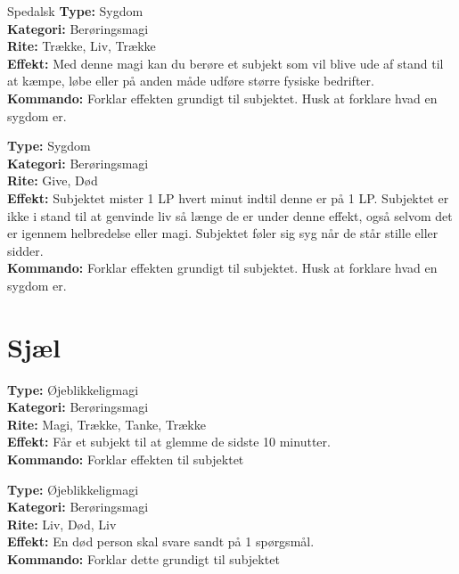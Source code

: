 \begin{sygdom*}Spedalsk
\textbf{Type:} Sygdom\\
\textbf{Kategori:} Berøringsmagi\\
\textbf{Rite:} Trække, Liv, Trække\\
\textbf{Effekt:} Med denne magi kan du berøre et subjekt som vil blive ude af stand til at kæmpe, løbe eller på anden måde udføre større fysiske bedrifter.\\
\textbf{Kommando:} Forklar effekten grundigt til subjektet. Husk at forklare hvad en sygdom er.
\end{sygdom*}

\begin{sygdom*}[Pest]
\textbf{Type:} Sygdom\\
\textbf{Kategori:} Berøringsmagi\\
\textbf{Rite:} Give, Død\\
\textbf{Effekt:} Subjektet mister 1 LP hvert minut indtil denne er på 1 LP. Subjektet er ikke i stand til at genvinde liv så længe de er under denne effekt, også selvom det er igennem helbredelse eller magi. Subjektet føler sig syg når de står stille eller sidder.\\
\textbf{Kommando:} Forklar effekten grundigt til subjektet. Husk at forklare hvad en sygdom er.
\end{sygdom*}

\section*{Sjæl}
\begin{nSjæl*}[Glemsel]
\textbf{Type:} Øjeblikkeligmagi\\
\textbf{Kategori:} Berøringsmagi\\
\textbf{Rite:} Magi, Trække, Tanke, Trække\\
\textbf{Effekt:} Får et subjekt til at glemme de sidste 10 minutter.\\
\textbf{Kommando:} Forklar effekten til subjektet
\end{nSjæl*}

\begin{nSjæl*}
\textbf{Type:} Øjeblikkeligmagi\\
\textbf{Kategori:} Berøringsmagi\\
\textbf{Rite:} Liv, Død, Liv\\
\textbf{Effekt:} En død person skal svare sandt på 1 spørgsmål.\\
\textbf{Kommando:} Forklar dette grundigt til subjektet
\end{nSjæl*}

